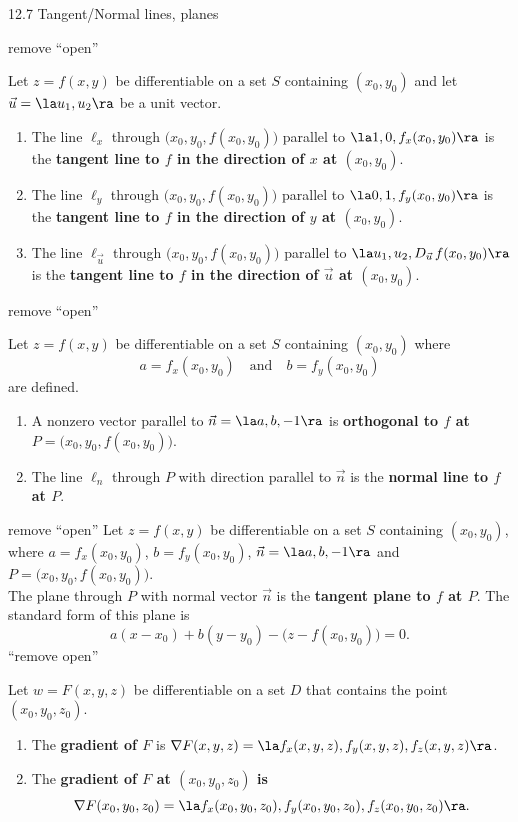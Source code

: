 \documentclass{article}
\begin{document}
12.7 Tangent/Normal lines, planes

remove ``open''
{Let $z=f(x,y)$ be differentiable on a set $S$ containing $(x_0,y_0)$ and let $\vec u = \la u_1, u_2\ra$ be a unit vector.
\begin{enumerate}
	\item The line $\ell_x$ through $\big(x_0,y_0,f(x_0,y_0)\big)$ parallel to $\la 1,0,f_x(x_0,y_0)\ra$	is the \textbf{tangent line to $f$ in the direction of $x$ at $(x_0,y_0)$}.
	
	\item The line $\ell_y$  through $\big(x_0,y_0,f(x_0,y_0)\big)$ parallel to $\la 0,1,f_y(x_0,y_0)\ra$	is the \textbf{tangent line to $f$ in the direction of $y$ at $(x_0,y_0)$}.
	
	\item	 The line $\ell_{\vec u}$ through $\big(x_0,y_0,f(x_0,y_0)\big)$ parallel to $\la u_1,u_2,D_{\vec u\,}f(x_0,y_0)\ra$	is the \textbf{tangent line to $f$ in the direction of $\vec u$ at $(x_0,y_0)$}.
	\end{enumerate}
}

remove ``open''
{Let $z=f(x,y)$ be differentiable on a set $S$ containing $(x_0,y_0)$ where
$$a = f_x(x_0,y_0) \quad \text{and}\quad b=f_y(x_0,y_0)$$
are defined.

\begin{enumerate}
\item	A nonzero vector parallel to $\vec n=\la a,b,-1\ra$ is \textbf{orthogonal to $f$ at $P=\big(x_0,y_0,f(x_0,y_0)\big)$}.

\item The line $\ell_n$ through $P$ with direction parallel to $\vec n$ is the \textbf{normal line to $f$ at $P$}.
\end{enumerate}
}

remove ``open''
{Let $z=f(x,y)$ be differentiable on a set $S$ containing $(x_0,y_0)$, where
$a = f_x(x_0,y_0)$, $b=f_y(x_0,y_0)$, $\vec n= \la a,b,-1\ra$ and $P=\big(x_0,y_0,f(x_0,y_0)\big)$.\\

The plane through $P$ with normal vector $\vec n$ is the \textbf{tangent plane to $f$ at $P$}. The standard form of this plane is 
$$a(x-x_0) + b(y-y_0) - \big(z-f(x_0,y_0)\big) = 0.$$
}
``remove open''
{Let $w=F(x,y,z)$ be differentiable on a set $D$ that contains the point $(x_0,y_0,z_0)$.
\begin{enumerate}
	\item The \textbf{gradient of $F$} is $\nabla F(x,y,z) = \la f_x(x,y,z),f_y(x,y,z),f_z(x,y,z)\ra$.
	\item The \textbf{gradient of $F$ at $(x_0,y_0,z_0)$ is $$\nabla F(x_0,y_0,z_0) = \la f_x(x_0,y_0,z_0),f_y(x_0,y_0,z_0),f_z(x_0,y_0,z_0)\ra.$$}
\end{enumerate}
\baselineskip
}
\end{document}
